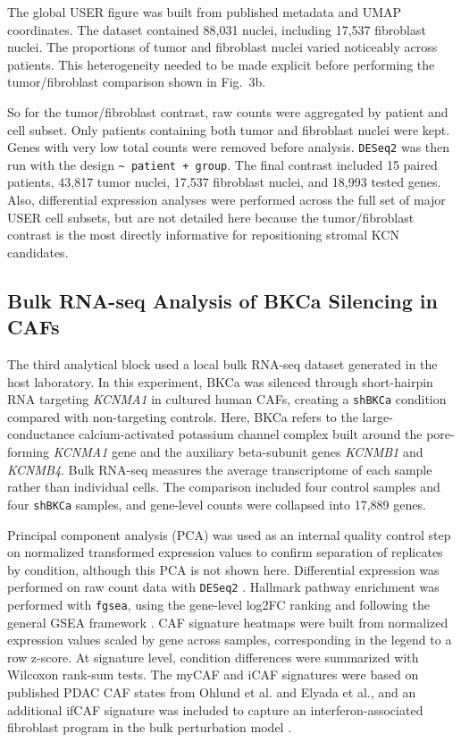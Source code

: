 \documentclass[11pt,a4paper]{article}
\begin{document}
The global USER figure was built from published metadata and UMAP coordinates. The dataset contained 88,031 nuclei, including 17,537 fibroblast nuclei. The proportions of tumor and fibroblast nuclei varied noticeably across patients. This heterogeneity needed to be made explicit before performing the tumor/fibroblast comparison shown in Fig.~3b.

So for the tumor/fibroblast contrast, raw counts were aggregated by patient and cell subset. Only patients containing both tumor and fibroblast nuclei were kept. Genes with very low total counts were removed before analysis. \texttt{DESeq2} was then run with the design \texttt{\textasciitilde{} patient + group}. The final contrast included 15 paired patients, 43,817 tumor nuclei, 17,537 fibroblast nuclei, and 18,993 tested genes.
Also, differential expression analyses were performed across the full set of major USER cell subsets, but are not detailed here because the tumor/fibroblast contrast is the most directly informative for repositioning stromal KCN candidates.

\subsection{Bulk RNA-seq Analysis of BKCa Silencing in CAFs}
The third analytical block used a local bulk RNA-seq dataset generated in the host laboratory. In this experiment, BKCa was silenced through short-hairpin RNA targeting \textit{KCNMA1} in cultured human CAFs, creating a \texttt{shBKCa} condition compared with non-targeting controls. Here, BKCa refers to the large-conductance calcium-activated potassium channel complex built around the pore-forming \textit{KCNMA1} gene and the auxiliary beta-subunit genes \textit{KCNMB1} and \textit{KCNMB4}. Bulk RNA-seq measures the average transcriptome of each sample rather than individual cells. The comparison included four control samples and four \texttt{shBKCa} samples, and gene-level counts were collapsed into 17,889 genes.

Principal component analysis (PCA) was used as an internal quality control step on normalized transformed expression values to confirm separation of replicates by condition, although this PCA is not shown here. Differential expression was performed on raw count data with \texttt{DESeq2} \citep{love2014}. Hallmark pathway enrichment was performed with \texttt{fgsea}, using the gene-level log2FC ranking and following the general GSEA framework \citep{subramanian2005,korotkevich2021}. CAF signature heatmaps were built from normalized expression values scaled by gene across samples, corresponding in the legend to a row z-score. At signature level, condition differences were summarized with Wilcoxon rank-sum tests. The myCAF and iCAF signatures were based on published PDAC CAF states from Ohlund et al. and Elyada et al., and an additional ifCAF signature was included to capture an interferon-associated fibroblast program in the bulk perturbation model \citep{ohlund2017,elyada2019}.
\end{document}
